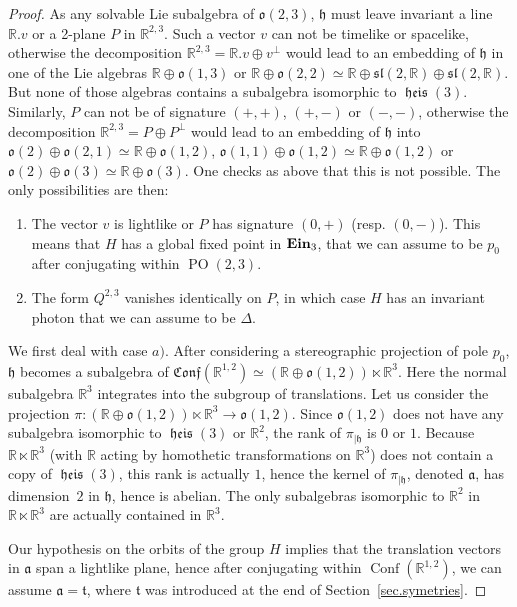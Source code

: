 \documentclass[11pt]{article}
\theoremstyle{definition}
\numberwithin{equation}{section}
\numberwithin{figure}{section}
\numberwithin{table}{section}
\DeclareMathOperator{\Conf}{Conf}
\DeclareMathOperator{\ein}{{\bf Ein}_3}
\DeclareMathOperator{\heis}{{\mathfrak{heis}}}
\newcommand*\RR{\mathbb{R}}
\newcommand{\lieh}{{\mathfrak{h}}}
\newcommand{\liea}{{\mathfrak{a}}}
\newcommand{\oo}{{\mathfrak{o}}}
\DeclareMathOperator{\POop}{PO}
\newcommand{\PO}{{\POop(2,3)}}
\newcommand*{\alphenumi}{\renewcommand*{\theenumi}{\alph{enumi}}}
\begin{document}
\begin{proof}
As any solvable Lie subalgebra of $\oo(2,3)$, $\lieh$ must leave invariant a line $\RR.v$ or a 2-plane $P$ in $\RR^{2,3}$. Such a vector $v$ can not be timelike or spacelike, otherwise the decomposition $\RR^{2,3}=\RR.v \oplus v^{\perp}$ would lead to an embedding of $\lieh$ in one of the Lie algebras $\RR \oplus \oo(1,3)$ or $\RR \oplus \oo(2,2) \simeq \RR \oplus \mathfrak{sl}(2,\RR) \oplus \mathfrak{sl}(2,\RR)$. But none of those algebras contains a subalgebra isomorphic to $\heis(3)$. Similarly, $P$ can not be of signature $(+,+)$, $(+,-)$ or $(-,-)$, otherwise the decomposition $\RR^{2,3}=P \oplus P^{\perp}$ would lead to an embedding of $\lieh$ into $\oo(2) \oplus \oo(2,1) \simeq \RR \oplus \oo(1,2)$, $\oo(1,1) \oplus \oo(1,2) \simeq \RR \oplus \oo(1,2)$ or $\oo(2) \oplus \oo(3) \simeq \RR \oplus \oo(3)$. One checks as above that this is not possible. The only possibilities are then:
\begin{enumerate}\alphenumi
\item \label{7.3.1}The vector $v$ is lightlike or $P$ has signature $(0,+)$ (resp. $(0,-)$). This means that $H$ has a global fixed point in $\ein$, that we can assume to be $p_0$ after conjugating within $\PO$.
\item \label{7.3.2}The form $Q^{2,3}$ vanishes identically on $P$, in which case $H$ has an invariant photon that we can assume to be $\Delta$.
\end{enumerate}



We first deal with case $a)$. After considering a stereographic projection of pole $p_0$, $\lieh$ becomes a subalgebra of $\mathfrak{Conf}(\RR^{1,2}) \simeq (\RR \oplus \oo(1,2)) \ltimes \RR^3$. Here the normal subalgebra $\RR^3$ integrates into the subgroup of translations. Let us consider the projection $\pi: (\RR \oplus \oo(1,2)) \ltimes \RR^3 \to \oo(1,2)$. Since $\oo(1,2)$ does not have any subalgebra isomorphic to $\heis(3)$ or $\RR^2$, the rank of $\pi_{|\lieh}$ is $0$ or $1$. Because $\RR \ltimes \RR^3$ (with $\RR$ acting by homothetic transformations on $\RR^3$) does not contain a copy of $\heis(3)$, this rank is actually $1$, hence the kernel of $\pi_{|\lieh}$, denoted $\liea$, has dimension~$2$ in $\lieh$, hence is abelian. The only subalgebras isomorphic to $\RR^2$ in $\RR \ltimes \RR^3$ are actually contained in $\RR^3$.

Our hypothesis on the orbits of the group $H$ implies that the translation vectors in $\liea$ span a lightlike plane, hence after conjugating within $\Conf(\RR^{1,2})$, we can assume $\liea=\mathfrak{t}$, where $\mathfrak{t}$ was introduced at the end of Section~\ref{sec.symetries}.



\end{proof}
\end{document}
